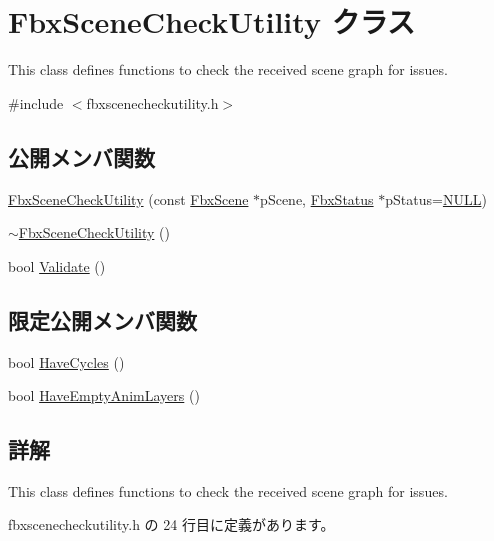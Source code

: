 \hypertarget{class_fbx_scene_check_utility}{}\section{Fbx\+Scene\+Check\+Utility クラス}
\label{class_fbx_scene_check_utility}


This class defines functions to check the received scene graph for issues.  




{\ttfamily \#include $<$fbxscenecheckutility.\+h$>$}

\subsection*{公開メンバ関数}
\begin{DoxyCompactItemize}
\item 
\hyperlink{class_fbx_scene_check_utility_ab5c3ab98b92bbf769e6dc0dbefd7812d}{Fbx\+Scene\+Check\+Utility} (const \hyperlink{class_fbx_scene}{Fbx\+Scene} $\ast$p\+Scene, \hyperlink{class_fbx_status}{Fbx\+Status} $\ast$p\+Status=\hyperlink{fbxarch_8h_a070d2ce7b6bb7e5c05602aa8c308d0c4}{N\+U\+LL})
\item 
\hyperlink{class_fbx_scene_check_utility_ac626dec2f6a4f4584e4a914ce9a68226}{$\sim$\+Fbx\+Scene\+Check\+Utility} ()
\item 
bool \hyperlink{class_fbx_scene_check_utility_a1ab351d6f370393663719a46ee4b6eff}{Validate} ()
\end{DoxyCompactItemize}
\subsection*{限定公開メンバ関数}
\begin{DoxyCompactItemize}
\item 
bool \hyperlink{class_fbx_scene_check_utility_a3998b242e9585b74917e7cd081dd9a5e}{Have\+Cycles} ()
\item 
bool \hyperlink{class_fbx_scene_check_utility_aca14381c6153cbfe485198f7f5e378ab}{Have\+Empty\+Anim\+Layers} ()
\end{DoxyCompactItemize}


\subsection{詳解}
This class defines functions to check the received scene graph for issues. 

 fbxscenecheckutility.\+h の 24 行目に定義があります。



